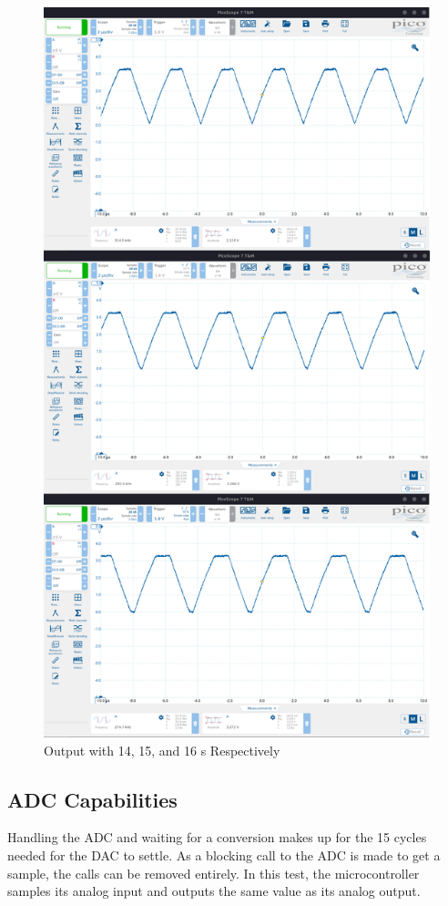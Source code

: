 \begin{figure}[H]
    \centering
    \includegraphics[width=120mm, keepaspectratio]{figures/comp.png}
    \caption{Output with 14, 15, and 16 s Respectively}
    \label{fig:comp}
\end{figure}

\subsection{ADC Capabilities}

Handling the ADC and waiting for a conversion makes up for the 15 cycles needed for the DAC to settle. As a blocking call to the ADC is made to get a sample, the  calls can be removed entirely. In this test, the microcontroller samples its analog input and outputs the same value as its analog output.

